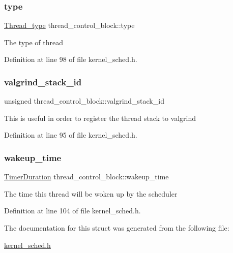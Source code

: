 \subsubsection{\texorpdfstring{type}{type}}
{\footnotesize\ttfamily \hyperlink{group__scheduler_ga18795bc1ab00161fc27ce34b1895fb03}{Thread\+\_\+type} thread\+\_\+control\+\_\+block\+::type}

The type of thread 

Definition at line 98 of file kernel\+\_\+sched.\+h.

\mbox{\label{structthread__control__block_ad8a2da36c0ad775c12c5f66f4fec9d41}} 
\subsubsection{\texorpdfstring{valgrind\+\_\+stack\+\_\+id}{valgrind\_stack\_id}}
{\footnotesize\ttfamily unsigned thread\+\_\+control\+\_\+block\+::valgrind\+\_\+stack\+\_\+id}

This is useful in order to register the thread stack to valgrind 

Definition at line 95 of file kernel\+\_\+sched.\+h.

\mbox{\label{structthread__control__block_a7dbf9ba7df67911abb7951e249f587b6}} 
\subsubsection{\texorpdfstring{wakeup\+\_\+time}{wakeup\_time}}
{\footnotesize\ttfamily \hyperlink{bios_8h_ae7291e5cd742fb9bc6d4aaa0d51bd0ee}{Timer\+Duration} thread\+\_\+control\+\_\+block\+::wakeup\+\_\+time}

The time this thread will be woken up by the scheduler 

Definition at line 104 of file kernel\+\_\+sched.\+h.



The documentation for this struct was generated from the following file\+:\begin{DoxyCompactItemize}
\item 
\hyperlink{kernel__sched_8h}{kernel\+\_\+sched.\+h}\end{DoxyCompactItemize}
